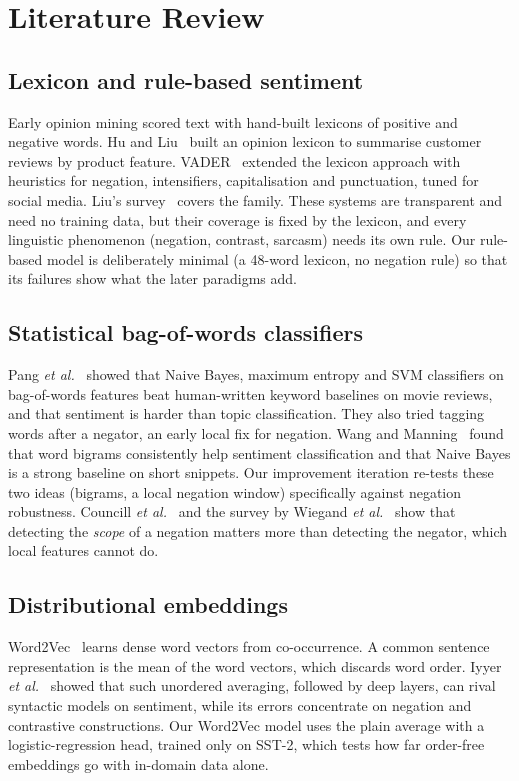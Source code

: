 \documentclass[conference]{IEEEtran}
\begin{document}
\section{Literature Review}\label{sec:lit}

\subsection{Lexicon and rule-based sentiment}
Early opinion mining scored text with hand-built lexicons of positive and negative words. Hu and
Liu~\cite{hu2004} built an opinion lexicon to summarise customer reviews by product feature.
VADER~\cite{hutto2014} extended the lexicon approach with heuristics for negation, intensifiers,
capitalisation and punctuation, tuned for social media. Liu's survey~\cite{liu2012} covers the
family. These systems are transparent and need no training data, but their coverage is fixed by
the lexicon, and every linguistic phenomenon (negation, contrast, sarcasm) needs its own rule.
Our rule-based model is deliberately minimal (a 48-word lexicon, no negation rule) so that its
failures show what the later paradigms add.

\subsection{Statistical bag-of-words classifiers}
Pang \emph{et al.}~\cite{pang2002} showed that Naive Bayes, maximum entropy and SVM classifiers on
bag-of-words features beat human-written keyword baselines on movie reviews, and that sentiment is
harder than topic classification. They also tried tagging words after a negator, an early local
fix for negation. Wang and Manning~\cite{wang2012} found that word bigrams consistently help
sentiment classification and that Naive Bayes is a strong baseline on short snippets. Our
improvement iteration re-tests these two ideas (bigrams, a local negation window) specifically
against negation robustness. Councill \emph{et al.}~\cite{councill2010} and the survey by
Wiegand \emph{et al.}~\cite{wiegand2010} show that detecting the \emph{scope} of a negation matters
more than detecting the negator, which local features cannot do.

\subsection{Distributional embeddings}
Word2Vec~\cite{mikolov2013a,mikolov2013b} learns dense word vectors from co-occurrence. A common
sentence representation is the mean of the word vectors, which discards word order. Iyyer
\emph{et al.}~\cite{iyyer2015} showed that such unordered averaging, followed by deep layers, can
rival syntactic models on sentiment, while its errors concentrate on negation and contrastive
constructions. Our Word2Vec model uses the plain average with a logistic-regression head, trained
only on SST-2, which tests how far order-free embeddings go with in-domain data alone.
\end{document}

